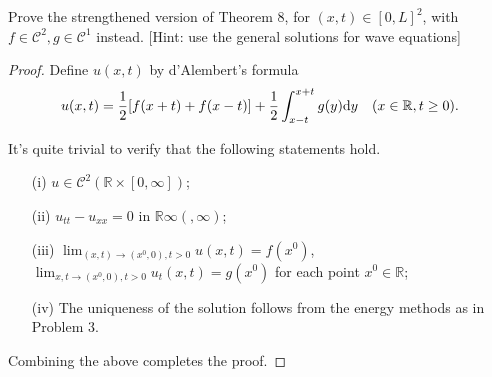 \begin{pro}
  Prove the strengthened version of Theorem 8,
  for $(x, t)\in[0, L]^2$,
  with $f\in\mathcal{C}^2, g\in\mathcal{C}^1$ instead.
  [Hint: use the general solutions for wave equations]
\end{pro}

\begin{proof}
  Define $u(x, t)$ by d'Alembert's formula
  \begin{equation}
    u(x, t) = \frac{1}{2}[f(x+t)+f(x-t)] + \frac{1}{2}\int_{x-t}^{x+t}g(y)
    \mathrm{d} y \quad (x\in\mathbb{R}, t \ge 0).
  \end{equation}

  It's quite trivial to verify that the following statements hold.
  \begin{itemize}
  \item[(i)]
    $u\in\mathcal{C}^2(\mathbb{R}\times[0, \infty])$;

  \item[(ii)]
    $u_{tt}-u_{xx}=0$ in $\mathbb{R}\infty(, \infty)$;

  \item[(iii)]
    $\lim_{(x, t)\to(x^0, 0), t>0}u(x, t) = f(x^0)$,
    $\lim_{{x,t}\to(x^0, 0), t>0}u_t(x, t) = g(x^0)$
    for each point $x^0\in\mathbb{R}$;

  \item[(iv)]
    The uniqueness of the solution follows from the energy methods
    as in Problem 3.
  \end{itemize}
  Combining the above completes the proof.
\end{proof}
